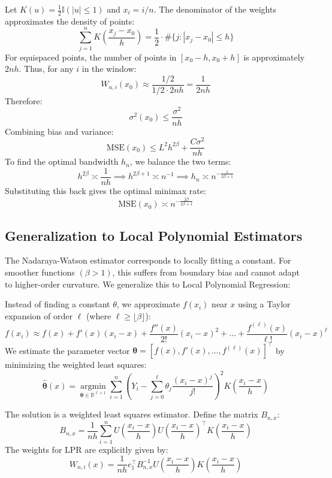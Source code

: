 \begin{eg}
Let $K(u) = \frac{1}{2} \mathbb{I}(|u| \le 1)$ and $x_i = i/n$.
The denominator of the weights approximates the density of points:
$$ \sum_{j=1}^n K\left( \frac{x_j - x_0}{h} \right) = \frac{1}{2} \cdot \#\{j : |x_j - x_0| \le h\} $$
For equispaced points, the number of points in $[x_0 - h, x_0 + h]$ is approximately $2nh$. Thus, for any $i$ in the window:
$$ W_{n,i}(x_0) \approx \frac{1/2}{1/2 \cdot 2nh} = \frac{1}{2nh} $$
Therefore:
$$ \sigma^2(x_0) \le \frac{\sigma^2}{nh} $$
Combining bias and variance:
$$ \text{MSE}(x_0) \le L^2 h^{2\beta} + \frac{C \sigma^2}{nh} $$
To find the optimal bandwidth $h_n$, we balance the two terms:
$$ h^{2\beta} \asymp \frac{1}{nh} \implies h^{2\beta+1} \asymp n^{-1} \implies h_n \asymp n^{-\frac{1}{2\beta+1}} $$
Substituting this back gives the optimal minimax rate:
$$ \text{MSE}(x_0) \asymp n^{-\frac{2\beta}{2\beta+1}} $$
\end{eg}

\subsection{Generalization to Local Polynomial Estimators}
The Nadaraya-Watson estimator corresponds to locally fitting a constant. For smoother functions $(\beta > 1)$, this suffers from boundary bias and cannot adapt to higher-order curvature. We generalize this to Local Polynomial Regression:

Instead of finding a constant $\theta$, we approximate $f(x_i)$ near $x$ using a Taylor expansion of order $\ell$ (where $\ell \ge \lfloor \beta \rfloor$):
$$ f(x_i) \approx f(x) + f'(x)(x_i - x) + \frac{f''(x)}{2!} (x_i - x)^2 + \dots + \frac{f^{(\ell)}(x)}{\ell!} (x_i - x)^\ell $$
We estimate the parameter vector $\boldsymbol{\theta} = [f(x), f'(x), \dots, f^{(\ell)}(x)]^\top$ by minimizing the weighted least squares:
$$ \hat{\boldsymbol{\theta}}(x) = \operatorname*{argmin}_{\boldsymbol{\theta} \in \mathbb{R}^{\ell+1}} \sum_{i=1}^n \left( Y_i - \sum_{j=0}^\ell \theta_j \frac{(x_i - x)^j}{j!} \right)^2 K\left( \frac{x_i - x}{h} \right) $$

The solution is a weighted least squares estimator. Define the matrix $B_{n,x}$:
$$ B_{n,x} = \frac{1}{nh} \sum_{i=1}^n U\left(\frac{x_i - x}{h}\right) U\left(\frac{x_i - x}{h}\right)^\top K\left( \frac{x_i - x}{h} \right) $$
The weights for LPR are explicitly given by:
$$ W_{n,i}(x) = \frac{1}{nh} e_1^\top B_{n,x}^{-1} U\left(\frac{x_i - x}{h}\right) K\left(\frac{x_i - x}{h}\right) $$

